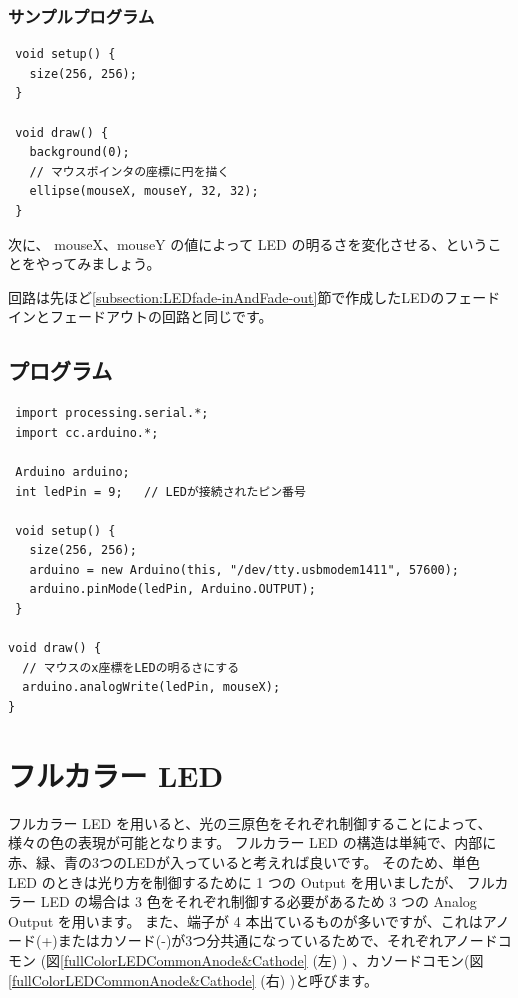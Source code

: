 \documentclass[11pt,a4paper]{jarticle}
\begin{document}
\subsubsection*{サンプルプログラム}
\begin{lstlisting}
 void setup() {
   size(256, 256);
 }

 void draw() {
   background(0);
   // マウスポインタの座標に円を描く
   ellipse(mouseX, mouseY, 32, 32);
 }
\end{lstlisting}

次に、 mouseX、mouseY の値によって LED の明るさを変化させる、ということをやってみましょう。


回路は先ほど\ref{subsection:LEDfade-inAndFade-out}節で作成したLEDのフェードインとフェードアウトの回路と同じです。


\subsection*{プログラム}
\begin{lstlisting}
 import processing.serial.*;
 import cc.arduino.*;
 
 Arduino arduino;
 int ledPin = 9;   // LEDが接続されたピン番号

 void setup() {
   size(256, 256);
   arduino = new Arduino(this, "/dev/tty.usbmodem1411", 57600);
   arduino.pinMode(ledPin, Arduino.OUTPUT);
 }

void draw() {
  // マウスのx座標をLEDの明るさにする 
  arduino.analogWrite(ledPin, mouseX);
}
\end{lstlisting}

\section{フルカラー LED}
フルカラー LED を用いると、光の三原色をそれぞれ制御することによって、様々の色の表現が可能となります。
フルカラー LED の構造は単純で、内部に赤、緑、青の3つのLEDが入っていると考えれば良いです。
そのため、単色 LED のときは光り方を制御するために 1 つの Output を用いましたが、
フルカラー LED の場合は 3 色をそれぞれ制御する必要があるため 3 つの Analog Output を用います。
また、端子が 4 本出ているものが多いですが、これはアノード(+)またはカソード(-)が3つ分共通になっているためで、それぞれアノードコモン (図\ref{fullColorLEDCommonAnode&Cathode} (左) ) 、カソードコモン(図\ref{fullColorLEDCommonAnode&Cathode} (右) )と呼びます。
\end{document}
